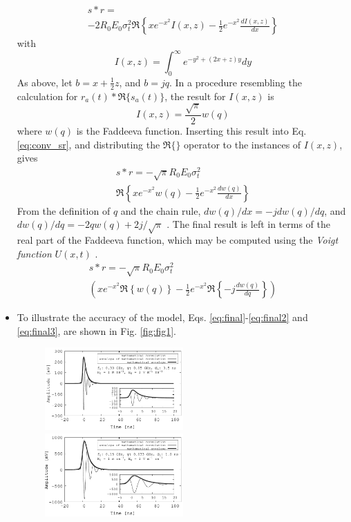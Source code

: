\documentclass[amsmath,amssymb,aps,prd,10pt,twocolumn,showkeys]{revtex4}
\begin{document}
\begin{itemize}
\begin{multline}
s * r = \\ -2R_0 E_0 \sigma_t^2 \Re\left\lbrace xe^{-x^2}I(x,z) - \frac{1}{2}e^{-x^2} \frac{dI(x,z)}{dx} \right\rbrace \label{eq:conv_sr}
\end{multline}
with
\begin{equation}
I(x,z) = \int_0^{\infty} e^{-y^2 + (2x + z)y}dy
\end{equation}
As above, let $b=x+\frac{1}{2}z$, and $b = j q$.  In a procedure resembling the calculation for $r_a(t) * \Re\lbrace s_a(t)\rbrace$, the result for $I(x,z)$ is
\begin{equation}
I(x,z) = \frac{\sqrt{\pi}}{2} w(q)
\end{equation}
where $w(q)$ is the Faddeeva function.  Inserting this result into Eq. \ref{eq:conv_sr}, and distributing the $\Re\lbrace \rbrace$ operator to the instances of $I(x,z)$, gives
\begin{multline}
s * r = -\sqrt{\pi}R_0 E_0 \sigma_t^2 \\ \Re\left\lbrace xe^{-x^2} w(q) - \frac{1}{2}e^{-x^2} \frac{d w(q)}{dx} \right\rbrace
\end{multline}
From the definition of $q$ and the chain rule, $dw(q)/dx = -jdw(q)/dq$, and $dw(q)/dq = -2qw(q)+2j/\sqrt{\pi}$ \cite{NIST:DLMF}.  The final result is left in terms of the real part of the Faddeeva function, which may be computed using the \textit{Voigt function} $U(x,t)$ \cite{NIST:DLMF,PhysRevD.105.123019}.
\begin{multline}
s * r = -\sqrt{\pi}R_0 E_0 \sigma_t^2 \\ \left(xe^{-x^2} \Re\left\lbrace w(q) \right\rbrace - \frac{1}{2}e^{-x^2} \Re\left\lbrace -j \frac{d w(q)}{dq} \right\rbrace \right) \label{eq:final3}
\end{multline}
\item To illustrate the accuracy of the model, Eqs. \ref{eq:final}-\ref{eq:final2} and \ref{eq:final3}, are shown in Fig. \ref{fig:fig1}.
\begin{figure}[ht]
\centering
\includegraphics[width=0.5\textwidth]{July3rd_plot1.pdf}
\includegraphics[width=0.5\textwidth]{July3rd_plot2.pdf}

\end{figure}
\end{itemize}
\end{document}
